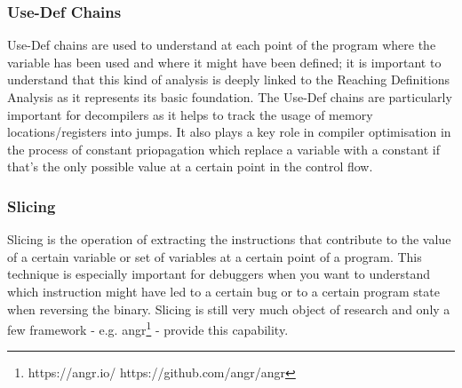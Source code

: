 \subsubsection{Use-Def Chains}
Use-Def chains are used to understand at each point of the program where the variable has been used and where it might
have been defined; it is important to understand that this kind of analysis is deeply linked to the Reaching Definitions
Analysis as it represents its basic foundation. The Use-Def chains are particularly important for decompilers as it
helps to track the usage of memory locations/registers into jumps. It also plays a key role in compiler optimisation in
the process of constant priopagation which replace a variable with a constant if that's the only possible value at a
certain point in the control flow.

\subsubsection{Slicing}
Slicing is the operation of extracting the instructions that contribute to the value of a certain variable or set of
variables at a certain point of a program. This technique is especially important for debuggers when you want to
understand which instruction might have led to a certain bug or to a certain program state when reversing the binary.
Slicing is still very much object of research and only a few framework - e.g. angr\footnote{https://angr.io/ \newline
https://github.com/angr/angr} -  provide this capability.

